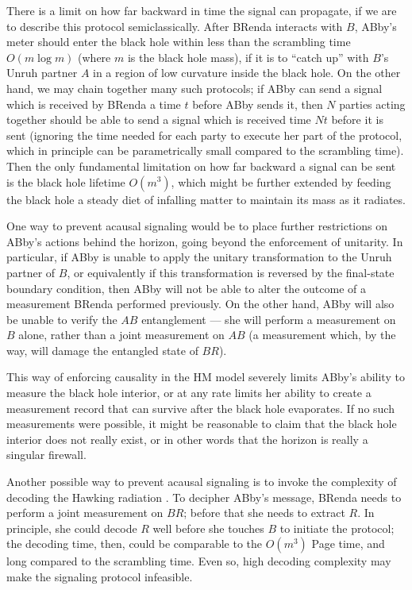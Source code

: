 \documentclass[11pt]{article}
\begin{document}
There is a limit on how far backward in time the signal can propagate, if we are to describe this protocol semiclassically. After BRenda interacts with $B$, ABby's meter should enter the black hole within less than the scrambling time $O(m \log m)$ (where $m$ is the black hole mass), if it is to ``catch up'' with $B$'s Unruh partner $A$ in a region of low curvature inside the black hole. On the other hand, we may chain together many such protocols; if ABby can send a signal which is received by BRenda a time $t$ before ABby sends it, then $N$ parties acting together should be able to send a signal which is received time $Nt$ before it is sent (ignoring the time needed for each party to execute her part of the protocol, which in principle can be parametrically small compared to the scrambling time). Then the only fundamental limitation on how far backward a signal can be sent is the black hole lifetime $O(m^3)$, which might be further extended by feeding the black hole a steady diet of infalling matter to maintain its mass as it radiates. 

One way to prevent acausal signaling would be to place further restrictions on ABby's actions behind the horizon, going beyond the enforcement of unitarity. In particular, if ABby is unable to apply the unitary transformation to the Unruh partner of $B$, or equivalently if this transformation is reversed by the final-state boundary condition, then ABby will not be able to alter the outcome of a measurement BRenda performed previously. On the other hand, ABby will also be unable to verify the $AB$ entanglement --- she will perform a measurement on $B$ alone, rather than a joint measurement on $AB$ (a measurement which, by the way, will damage the entangled state of $BR$). 

This way of enforcing causality in the HM model severely limits ABby's ability to measure the black hole interior, or at any rate limits her ability to create a measurement record that can survive after the black hole evaporates. If no such measurements were possible, it might be reasonable to claim that the black hole interior does not really exist, or in other words that the horizon is really a singular firewall.

Another possible way to prevent acausal signaling is to invoke the complexity of decoding the Hawking radiation \cite{harlow-hayden}. To decipher ABby's message, BRenda needs to perform a joint measurement on $BR$; before that she needs to extract $R$. In principle, she could decode $R$ well before she touches $B$ to initiate the protocol; the decoding time, then, could be comparable to the $O(m^3)$ Page time, and long compared to the scrambling time. Even so, high decoding complexity may make the signaling protocol infeasible. 
\end{document}
